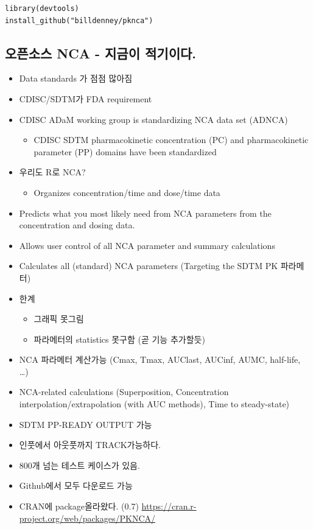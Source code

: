 \documentclass[
  10pt,
]{krantz}
\providecommand{\tightlist}{%
  \setlength{\itemsep}{0pt}\setlength{\parskip}{0pt}}
\begin{document}
\begin{verbatim}
library(devtools)
install_github("billdenney/pknca")
\end{verbatim}

\hypertarget{opennca}{%
\subsection{오픈소스 NCA - 지금이 적기이다.}\label{opennca}}

\begin{itemize}
\tightlist
\item
  Data standards 가 점점 많아짐
\item
  CDISC/SDTM가 FDA requirement
\item
  CDISC ADaM working group is standardizing NCA data set (ADNCA) \textbar{}

  \begin{itemize}
  \tightlist
  \item
    CDISC SDTM pharmacokinetic concentration (PC) and pharmacokinetic parameter (PP) domains have been standardized
  \end{itemize}
\item
  우리도 R로 NCA?

  \begin{itemize}
  \tightlist
  \item
    Organizes concentration/time and dose/time data
  \end{itemize}
\item
  Predicts what you most likely need from NCA parameters from the concentration and dosing data.
\item
  Allows user control of all NCA parameter and summary calculations
\item
  Calculates all (standard) NCA parameters (Targeting the SDTM PK 파라메터)
\item
  한계

  \begin{itemize}
  \tightlist
  \item
    그래픽 못그림
  \item
    파라메터의 statistics 못구함 (곧 기능 추가할듯)
  \end{itemize}
\item
  NCA 파라메터 계산가능 (Cmax, Tmax, AUClast, AUCinf, AUMC, half-life, \ldots)
\item
  NCA-related calculations (Superposition, Concentration interpolation/extrapolation (with AUC methods), Time to steady-state)
\item
  SDTM PP-READY OUTPUT 가능
\item
  인풋에서 아웃풋까지 TRACK가능하다.
\item
  800개 넘는 테스트 케이스가 있음.
\item
  Github에서 모두 다운로드 가능
\item
  CRAN에 package올라왔다. (0.7) \url{https://cran.r-project.org/web/packages/PKNCA/}


\end{itemize}
\end{document}
